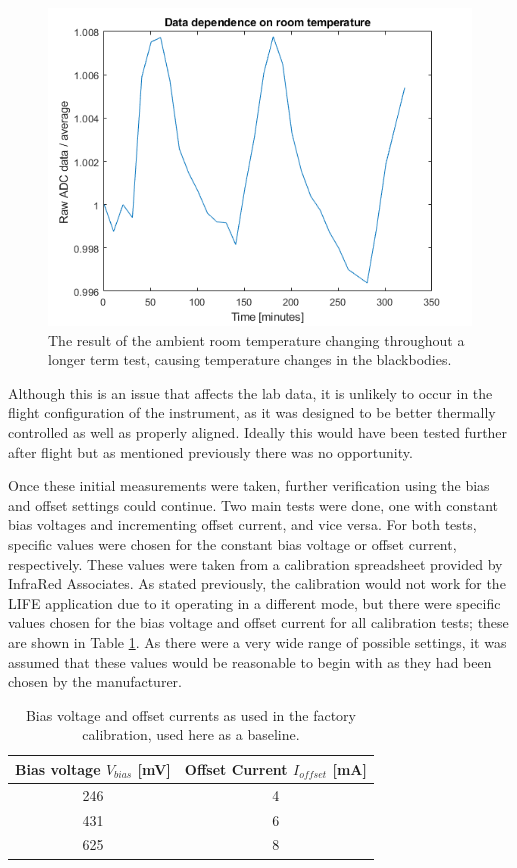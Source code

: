 \begin{figure}[h]
  \centering
  \includegraphics[width=0.8\linewidth]{chap5_images/DC_dep_on_room_temp.png}
  \caption{The result of the ambient room temperature changing throughout a longer term test, causing temperature changes in the blackbodies.}
  \label{fig:ADC_dep_on_room_temp}
\end{figure}

Although this is an issue that affects the lab data, it is unlikely to occur in the flight configuration of the instrument, as it was designed to be better thermally controlled as well as properly aligned. Ideally this would have been tested further after flight but as mentioned previously there was no opportunity. 

Once these initial measurements were taken, further verification using the bias and offset settings could continue. Two main tests were done, one with constant bias voltages and incrementing offset current, and vice versa. For both tests, specific values were chosen for the constant bias voltage or offset current, respectively. These values were taken from a calibration spreadsheet provided by InfraRed Associates. As stated previously, the calibration would not work for the LIFE application due to it operating in a different mode, but there were specific values chosen for the bias voltage and offset current for all calibration tests; these are shown in Table \ref{vbias_ioffset_table}. As there were a very wide range of possible settings, it was assumed that these values would be reasonable to begin with as they had been chosen by the manufacturer. 

\begin{table}[h]
\begin{center}
\begin{tabular}{ |c|c| } 
 \hline
 \rowcolor{lightgray}
 Bias voltage $V_{bias}$ [mV] &  Offset Current $I_{offset}$ [mA]\\ 
 \hline
  246 & 4 \\ 
  \hline
 431 & 6  \\
 \hline
 625 & 8 \\
 \hline
 \end{tabular}
\end{center}
\caption{Bias voltage and offset currents as used in the factory calibration, used here as a baseline.}
\label{vbias_ioffset_table}
\end{table}

